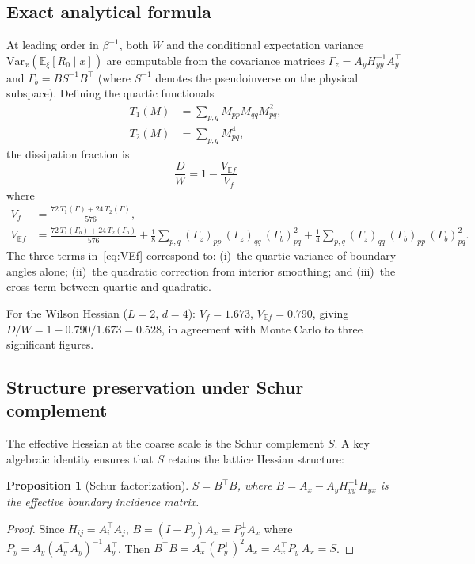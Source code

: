 \documentclass[11pt]{article}
\newtheorem{proposition}[theorem]{Proposition}
\theoremstyle{definition}
\newcommand{\Var}{\mathrm{Var}}
\newcommand{\E}{\mathbb{E}}
\begin{document}
\subsection{Exact analytical formula}

At leading order in $\beta^{-1}$, both $W$ and the conditional expectation 
variance $\Var_x(\E_\xi[R_0 \mid x])$ are computable from the covariance 
matrices $\Gamma_z = A_y H_{yy}^{-1} A_y^\top$ and 
$\Gamma_b = B S^{-1} B^\top$ (where $S^{-1}$ denotes the pseudoinverse on 
the physical subspace).  Defining the quartic functionals
\begin{align}
  T_1(M) &= \sum_{p,q} M_{pp} M_{qq} M_{pq}^2, \\
  T_2(M) &= \sum_{p,q} M_{pq}^4,
\end{align}
the dissipation fraction is
\begin{equation}\label{eq:DW_exact}
  \frac{D}{W} = 1 - \frac{V_{\E f}}{V_f}
\end{equation}
where
\begin{align}
  V_f &= \frac{72\,T_1(\Gamma) + 24\,T_2(\Gamma)}{576}, \label{eq:Vf}\\
  V_{\E f} &= \frac{72\,T_1(\Gamma_b) + 24\,T_2(\Gamma_b)}{576}
  + \frac{1}{8}\sum_{p,q} (\Gamma_z)_{pp}\,(\Gamma_z)_{qq}\,(\Gamma_b)_{pq}^2
  + \frac{1}{4}\sum_{p,q} (\Gamma_z)_{qq}\,(\Gamma_b)_{pp}\,(\Gamma_b)_{pq}^2.
  \label{eq:VEf}
\end{align}
The three terms in~\eqref{eq:VEf} correspond to: (i)~the quartic variance 
of boundary angles alone; (ii)~the quadratic correction from interior 
smoothing; and (iii)~the cross-term between quartic and quadratic.

For the Wilson Hessian ($L = 2$, $d = 4$): $V_f = 1.673$, $V_{\E f} = 0.790$,
giving $D/W = 1 - 0.790/1.673 = 0.528$, in agreement with Monte Carlo to 
three significant figures.

\subsection{Structure preservation under Schur complement}

The effective Hessian at the coarse scale is the Schur complement $S$.  
A key algebraic identity ensures that $S$ retains the lattice Hessian 
structure:
\begin{proposition}[Schur factorization]\label{prop:schur_factor}
$S = B^\top B$, where $B = A_x - A_y H_{yy}^{-1} H_{yx}$ is the 
effective boundary incidence matrix.
\end{proposition}
\begin{proof}
Since $H_{ij} = A_i^\top A_j$, $B = (I - P_y)A_x = P_y^\perp A_x$ where 
$P_y = A_y(A_y^\top A_y)^{-1}A_y^\top$.  Then 
$B^\top B = A_x^\top (P_y^\perp)^2 A_x = A_x^\top P_y^\perp A_x = S$.
\end{proof}
\end{document}
